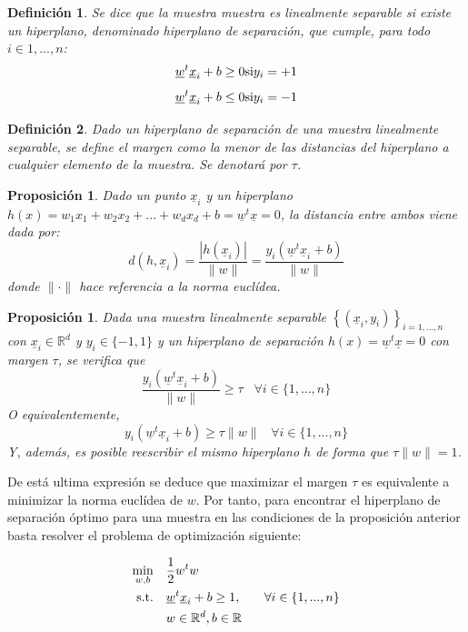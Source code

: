 \documentclass[12pt,a4paper,]{book}
\newcounter{dummy}
\numberwithin{dummy}{section}
\theoremstyle{ocrenumbox}
\theoremstyle{blacknumex}
\theoremstyle{blacknumbox}
\newtheorem{definitionT}{Definición}[section]  %
\theoremstyle{ocrenum}
\newtheorem{proposition}[dummy]{Proposición} %
\newenvironment{definition}{\begin{dBox}\begin{definitionT}}{\end{definitionT}\end{dBox}}
\theoremstyle{ocrenum}
\begin{document}
\begin{definition}
Se dice que la muestra muestra es linealmente separable si existe un hiperplano, denominado hiperplano de separación, que cumple, para todo $i \in 1,...,n$:
$$\underline w^t \underline x_i + b \ge 0 \space \space \text{si} \space \space y_i=+1$$
$$\underline w^t \underline x_i + b \le 0 \space \space \text{si} \space \space y_i=-1$$
\end{definition}

\begin{definition}
Dado un hiperplano de separación de una muestra linealmente separable, se define el margen como la menor de las distancias del hiperplano a cualquier elemento de la muestra. Se denotará por $\tau$.
\end{definition}

\begin{proposition}
Dado un punto $\underline x_i$ y un hiperplano $h(x) = w_1x_1 +w_2x_2+...+w_dx_d +b = \underline w^t \underline x = 0$, la distancia entre ambos viene dada por:
$$d(h,\underline x_i) = \frac{|h(\underline x_i)|}{\|w\|} = \frac{y_i(\underline w^t \underline x_i+b)}{\|w\|}$$
donde $\|\cdot\|$ hace referencia a la norma euclídea.
\end{proposition}

\begin{proposition}
Dada una muestra linealmente separable $\left\{(\underline x_i,y_i) \right\}_{i=1,...,n}$ con $\underline x_i \in \mathbb{R}^d$ y $y_i \in \{-1,1\}$ y un hiperplano de separación $h(x) = \underline w^t \underline x = 0$ con margen $\tau$, se verifica que
$$\frac{y_i(\underline w^t \underline x_i+b)}{\|w\|} \ge \tau \;\;\; \forall i\in \{1,...,n\}$$
O equivalentemente,
$$y_i(\underline w^t \underline x_i+b) \ge \tau\|w\| \;\;\; \forall i\in \{1,...,n\}$$
Y, además, es posible reescribir el mismo hiperplano $h$ de forma que $\tau\|w\| = 1$.
\end{proposition}

De está ultima expresión se deduce que maximizar el margen \(\tau\) es
equivalente a minimizar la norma euclídea de \(w\). Por tanto, para
encontrar el hiperplano de separación óptimo para una muestra en las
condiciones de la proposición anterior basta resolver el problema de
optimización siguiente:

\begin{equation}
\begin{aligned}
\min_{w,b} \quad & \frac{1}{2}w^{t}w\\
\textrm{s.t.} \quad & \underline w^t \underline x_i+b \ge 1, \quad & \forall i\in \{1,...,n\} \\
  & w \in \mathbb{R}^d, \space b \in \mathbb{R} \\ 
\end{aligned}
\end{equation}
\end{document}
